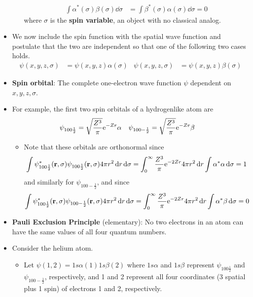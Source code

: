\documentclass[../notes.tex]{subfiles}
\begin{document}
\begin{itemize}
\begin{itemize}
\begin{align*}
            \int\alpha^*(\sigma)\beta(\sigma)\dd{\sigma} &= \int\beta^*(\sigma)\alpha(\sigma)\dd{\sigma} = 0
        \end{align*}
        where $\sigma$ is the \textbf{spin variable}, an object with no classical analog.
    \end{itemize}
    \item We now include the spin function with the spatial wave function and postulate that the two are independent so that one of the following two cases holds.
    \begin{align*}
        \psi(x,y,z,\sigma) &= \psi(x,y,z)\alpha(\sigma)&
        \psi(x,y,z,\sigma) &= \psi(x,y,z)\beta(\sigma)
    \end{align*}
    \item \textbf{Spin orbital}: The complete one-electron wave function $\psi$ dependent on $x,y,z,\sigma$.
    \item For example, the first two spin orbitals of a hydrogenlike atom are
    \begin{align*}
        \psi_{100\frac{1}{2}} &= \sqrt{\frac{Z^3}{\pi}}\e[-Zr]\alpha&
        \psi_{100-\frac{1}{2}} &= \sqrt{\frac{Z^3}{\pi}}\e[-Zr]\beta
    \end{align*}
    \begin{itemize}
        \item Note that these orbitals are orthonormal since
        \begin{equation*}
            \int\psi_{100\frac{1}{2}}^*(\mathbf{r},\sigma)\psi_{100\frac{1}{2}}(\mathbf{r},\sigma)4\pi r^2\dd{r}\dd{\sigma} = \int_0^\infty\frac{Z^3}{\pi}\e[-2Zr]4\pi r^2\dd{r}\int\alpha^*\alpha\dd{\sigma} = 1
        \end{equation*}
        and similarly for $\psi_{100-\frac{1}{2}}$, and since
        \begin{equation*}
            \int\psi_{100\frac{1}{2}}^*(\mathbf{r},\sigma)\psi_{100-\frac{1}{2}}(\mathbf{r},\sigma)4\pi r^2\dd{r}\dd{\sigma} = \int_0^\infty\frac{Z^3}{\pi}\e[-2Zr]4\pi r^2\dd{r}\int\alpha^*\beta\dd{\sigma} = 0
        \end{equation*}
    \end{itemize}
    \item \textbf{Pauli Exclusion Principle} (elementary): No two electrons in an atom can have the same values of all four quantum numbers.
    \item Consider the helium atom.
    \begin{itemize}
        \item Let $\psi(1,2)=1s\alpha(1)1s\beta(2)$ where $1s\alpha$ and $1s\beta$ represent $\psi_{100\frac{1}{2}}$ and $\psi_{100-\frac{1}{2}}$, respectively, and 1 and 2 represent all four coordinates (3 spatial plus 1 spin) of electrons 1 and 2, respectively.

\end{itemize}
\end{itemize}
\end{document}
